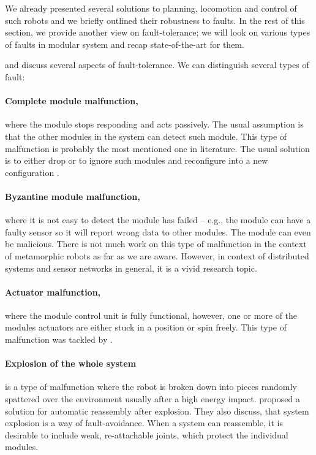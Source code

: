 We already presented several solutions to planning, locomotion and control of
such robots and we briefly outlined their robustness to faults. In the rest of
this section, we provide another view on fault-tolerance; we will look on
various types of faults in modular system and recap state-of-the-art for them.

\cite{DKbotDistr} and \cite{4141032} discuss several aspects of
fault-tolerance. We can distinguish several types of fault:

\paragraph{Complete module malfunction,} where the module stops responding and
acts passively. The usual assumption is that the other modules in the system can
detect such module. This type of malfunction is probably the most mentioned one
in literature. The usual solution is to either drop or to ignore such
modules and reconfigure into a new configuration
\cite{DMotionCoord, DBLP:conf/ieeealife/Christensen07, DBLP:conf/iros/DaveyKY12}.

\paragraph{Byzantine module malfunction,} where it is not easy to detect the
module has failed -- e.g., the module can have a faulty sensor so it will report
wrong data to other modules. The module can even be malicious. There is not much
work on this type of malfunction in the context of metamorphic robots as far as
we are aware. However, in context of distributed systems and sensor networks in
general, it is a vivid research topic.

\paragraph{Actuator malfunction,} where the module control unit is fully
functional, however, one or more of the modules actuators are either stuck
in a position or spin freely. This type of malfunction was tackled by
\textcite{DBLP:conf/romoco/VonasekONW15}.

\paragraph{Explosion of the whole system} is a type of malfunction where the
robot is broken down into pieces randomly spattered over the environment usually
after a high energy impact. \textcite{DBLP:conf/iros/YimSSPDT07a} proposed a
solution for automatic reassembly after explosion. They also discuss, that
system explosion is a way of fault-avoidance. When a system can reassemble, it
is desirable to include weak, re-attachable joints, which protect the individual
modules.

